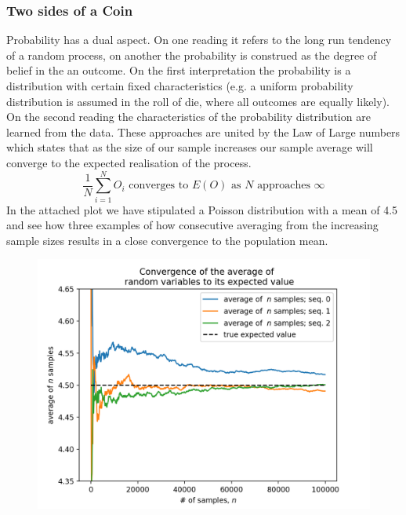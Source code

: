 \documentclass[10pt,a4paper,notitlepage, twocolumn]{article}
\begin{document}
\subsubsection*{Two sides of a Coin}
Probability has a dual aspect. On one reading it refers to the long run tendency of a random process, on another the probability is construed as the degree of belief in the an outcome. On the first interpretation the probability is a distribution with certain fixed characteristics (e.g. a uniform probability distribution is assumed in the roll of die, where all outcomes are equally likely). On the second reading the characteristics of the probability distribution are learned from the data. These approaches are united by the Law of Large numbers which states that as the size of our sample increases our sample average will converge to the expected realisation of the process.
$$  \frac{1}{N} \sum_{i = 1}^{N} O_{i} \text{ converges to }  E(O) \text{ as } N \text{ approaches } \infty $$ In the attached plot we have stipulated a Poisson distribution with a mean of 4.5 and see how three examples of how consecutive averaging from the increasing sample sizes results in a close convergence to the population mean.
\begin{figure}[H]
  \includegraphics[width=\linewidth]{./Plots/convergence_of_law_of_large_numbers.png}
\end{figure}
\end{document}
